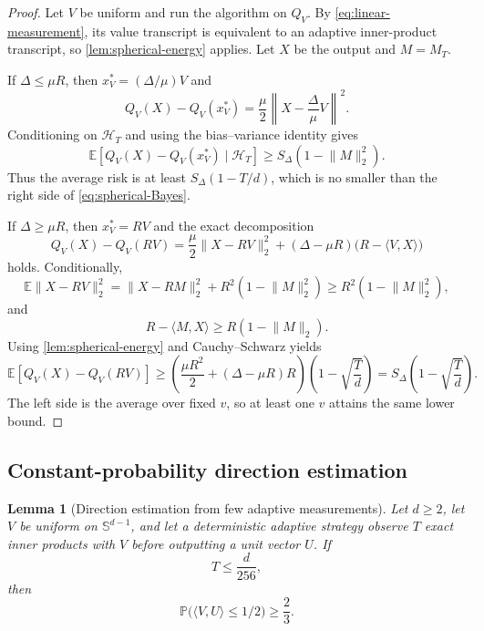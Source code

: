 \documentclass[11pt]{article}
\newcommand{\E}{\mathbb{E}}
\newcommand{\Pp}{\mathbb{P}}
\newcommand{\Sph}{\mathbb{S}}
\newcommand{\inner}[2]{\langle #1,#2\rangle}
\newcommand{\norm}[1]{\lVert #1\rVert_2}
\theoremstyle{plain}
\newtheorem{lemma}[lemma]{Lemma}
\theoremstyle{definition}
\begin{document}
\begin{proof}
Let $V$ be uniform and run the algorithm on $Q_V$.  By \eqref{eq:linear-measurement}, its value transcript is equivalent to an adaptive inner-product transcript, so \cref{lem:spherical-energy} applies.  Let $X$ be the output and $M=M_T$.

If $\Delta\le\mu R$, then $x_V^*=(\Delta/\mu)V$ and
\[
  Q_V(X)-Q_V(x_V^*)
  =\frac{\mu}{2}\left\|X-\frac{\Delta}{\mu}V\right\|^2.
\]
Conditioning on $\mathcal H_T$ and using the bias--variance identity gives
\[
  \E[Q_V(X)-Q_V(x_V^*)\mid\mathcal H_T]
  \ge S_\Delta(1-\norm{M}^2).
\]
Thus the average risk is at least $S_\Delta(1-T/d)$, which is no smaller than the right side of \eqref{eq:spherical-Bayes}.

If $\Delta\ge\mu R$, then $x_V^*=RV$ and the exact decomposition
\begin{equation}\label{eq:boundary-gap-decomp}
 Q_V(X)-Q_V(RV)
 =\frac{\mu}{2}\norm{X-RV}^2
   +(\Delta-\mu R)\bigl(R-\inner{V}{X}\bigr)
\end{equation}
holds.  Conditionally,
\[
  \E\norm{X-RV}^2
  =\norm{X-RM}^2+R^2(1-\norm{M}^2)
  \ge R^2(1-\norm{M}^2),
\]
and
\[
  R-\inner{M}{X}\ge R(1-\norm{M}).
\]
Using \cref{lem:spherical-energy} and Cauchy--Schwarz yields
\[
  \E[Q_V(X)-Q_V(RV)]
  \ge\left(\frac{\mu R^2}{2}+(\Delta-\mu R)R\right)
       \left(1-\sqrt{\frac{T}{d}}\right)
  =S_\Delta\left(1-\sqrt{\frac{T}{d}}\right).
\]
The left side is the average over fixed $v$, so at least one $v$ attains the same lower bound.
\end{proof}

\subsection{Constant-probability direction estimation}

\begin{lemma}[Direction estimation from few adaptive measurements]\label{lem:direction-estimation}
Let $d\ge2$, let $V$ be uniform on $\Sph^{d-1}$, and let a deterministic adaptive strategy observe $T$ exact inner products with $V$ before outputting a unit vector $U$.  If
\[
   T\le\frac{d}{256},
\]
then
\begin{equation}\label{eq:direction-prob}
   \Pp\bigl(\inner{V}{U}\le1/2\bigr)\ge\frac23.
\end{equation}
\end{lemma}
\end{document}
